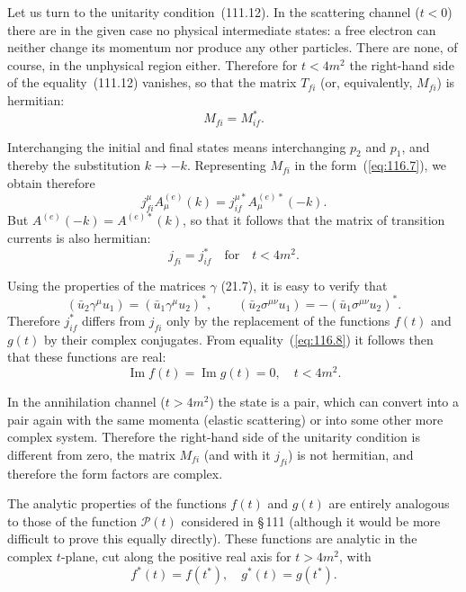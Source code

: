 
Let us turn to the unitarity condition~(111.12). In the scattering channel ($t < 0$) there are in the given case no physical intermediate states: a free electron can neither change its momentum nor produce any other particles. There are none, of course, in the unphysical region either. Therefore for $t < 4m^2$ the right-hand side of the equality~(111.12) vanishes, so that the matrix $T_{fi}$ (or, equivalently, $M_{fi}$) is hermitian:
\[
M_{fi} = M_{if}^*.
\]

Interchanging the initial and final states means interchanging $p_2$ and $p_1$, and thereby the substitution $k \to -k$. Representing $M_{fi}$ in the form~(\ref{eq:116.7}), we obtain therefore
\[
j_{fi}^\mu A_\mu^{(e)}(k) = j_{if}^{\mu*} A_\mu^{(e)*}(-k).
\]
But $A^{(e)}(-k) = A^{(e)*}(k)$, so that it follows that the matrix of transition currents is also hermitian:
\begin{equation}
j_{fi} = j_{if}^* \quad \text{for} \quad t < 4m^2.
\label{eq:116.8}
\end{equation}

Using the properties of the matrices $\gamma$ (21.7), it is easy to verify that
\[
(\bar{u}_2\gamma^\mu u_1) = (\bar{u}_1\gamma^\mu u_2)^*, \qquad (\bar{u}_2\sigma^{\mu\nu}u_1) = -(\bar{u}_1\sigma^{\mu\nu}u_2)^*.
\]
Therefore $j_{if}^*$ differs from $j_{fi}$ only by the replacement of the functions $f(t)$ and $g(t)$ by their complex conjugates. From equality~(\ref{eq:116.8}) it follows then that these functions are real:
\begin{equation}
\operatorname{Im} f(t) = \operatorname{Im} g(t) = 0, \quad t < 4m^2.
\label{eq:116.9}
\end{equation}

In the annihilation channel ($t > 4m^2$) the state is a pair, which can convert into a pair again with the same momenta (elastic scattering) or into some other more complex system. Therefore the right-hand side of the unitarity condition is different from zero, the matrix $M_{fi}$ (and with it $j_{fi}$) is not hermitian, and therefore the form factors are complex.

The analytic properties of the functions $f(t)$ and $g(t)$ are entirely analogous to those of the function $\mathcal{P}(t)$ considered in \S\,111 (although it would be more difficult to prove this equally directly). These functions are analytic in the complex $t$-plane, cut along the positive real axis for $t > 4m^2$, with
\[
f^*(t) = f(t^*), \quad g^*(t) = g(t^*).
\]

